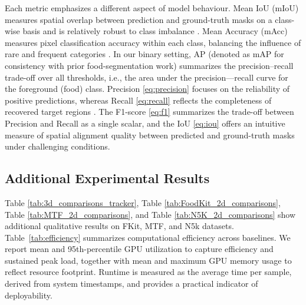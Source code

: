 \documentclass[preprint,12pt]{elsarticle}
\begin{document}
Each metric emphasizes a different aspect of model behaviour. Mean IoU (mIoU) measures spatial overlap between prediction and ground-truth masks on a class-wise basis and is relatively robust to class imbalance \cite{everingham2010pascal}. Mean Accuracy (mAcc) measures pixel classification accuracy within each class, balancing the influence of rare and frequent categories \cite{long2015fully}. In our binary setting, AP (denoted as mAP for consistency with prior food-segmentation work) summarizes the precision--recall trade-off over all thresholds, i.e., the area under the precision—recall curve for the foreground (food) class. Precision \eqref{eq:precision} focuses on the reliability of positive predictions, whereas Recall \eqref{eq:recall} reflects the completeness of recovered target regions \cite{papadopoulos2017training}. The F1-score \eqref{eq:f1} summarizes the trade-off between Precision and Recall as a single scalar, and the IoU \eqref{eq:iou} offers an intuitive measure of spatial alignment quality between predicted and ground-truth masks under challenging conditions.

\subsection{Additional Experimental Results}
\label{sec:additional_experimental_results}
Table \ref{tab:3d_comparisons_tracker}, Table \ref{tab:FoodKit_2d_comparisons}, Table \ref{tab:MTF_2d_comparisons}, and Table \ref{tab:N5K_2d_comparisons} show additional qualitative results on FKit, MTF, and N5k datasets. Table~\ref{tab:efficiency} summarizes computational efficiency across baselines. We report mean and 95th-percentile GPU utilization to capture efficiency and sustained peak load, together with mean and maximum GPU memory usage to reflect resource footprint. Runtime is measured as the average time per sample, derived from system timestamps, and provides a practical indicator of deployability.
\end{document}
